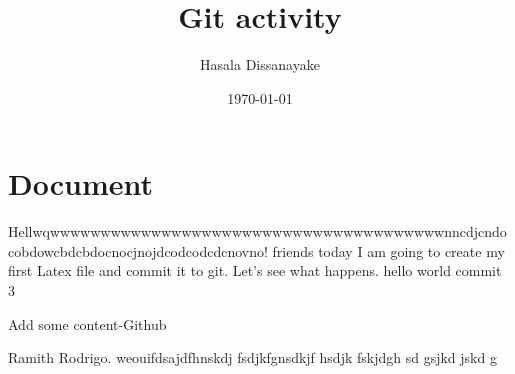 \documentclass[a4 paper]{article}
\title{Git activity}
\author{Hasala Dissanayake}
\date{\today}
\begin{document}
\maketitle
\section{Document}

Hellwqwwwwwwwwwwwwwwwwwwwwwwwwwwwwwwwwwwwwwwwnncdjcndocobdowcbdcbdocnocjnojdcodcodcdcnovno! friends today I am going to create my first Latex file and commit it to git. Let's see what happens.
hello world
commit 3

Add some content-Github 

\newpage
Ramith Rodrigo. weouifdsajdfhnskdj fsdjkfgnsdkjf hsdjk fskjdgh sd gsjkd jskd g
\end{document}
